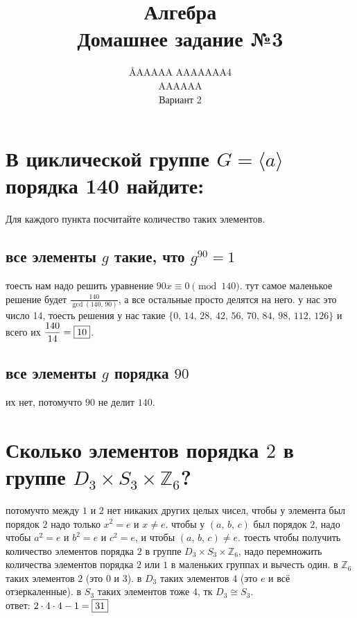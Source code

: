 \documentclass{article}
\title{Алгебра \\ Домашнее задание №3}
\author{\AA{AAAAA AAAAAAA}{4} \\ AAAAAA \\ Вариант 2}
\newcommand{\ds}{\displaystyle}
\newcommand{\Z}{\mathbb{Z}}
\renewcommand{\f}{\frac}
\begin{document}
  \maketitle

  \section{В циклической группе $G = \langle a \rangle$ порядка 140 найдите:}
  Для каждого пункта посчитайте количество таких элементов.
  \subsection{все элементы $g$ такие, что $g^{90} = 1$}
  тоесть нам надо решить уравнение $90x \equiv 0 \pmod{140}$.
  тут самое маленькое решение будет $\ds\f{140}{\gcd(140,\,90)}$,
  а все остальные просто делятся на него.
  у нас это число 14, тоесть решения у нас такие $\{0,\,14,\,28,\,42,\,56,\,70,\,84,\,98,\,112,\,126\}$
  и всего их $\ds \f{140}{14} = \fbox{10}$.
  \subsection{все элементы $g$ порядка $90$}
  их нет, потомучто $90$ не делит $140$.

  \section{Сколько элементов порядка $2$ в группе $D_3 \times S_3 \times \Z_6$?}
  потомучто между $1$ и $2$ нет никаких других целых чисел,
  чтобы у элемента был порядок $2$ надо только $x^2 = e$ и $x \neq e$.
  чтобы у $(a,\, b,\, c)$ был порядок $2$, надо чтобы $a^2 = e$ и $b^2 = e$ и $c^2 = e$, и чтобы $(a,\, b,\, c) \neq e$.
  тоесть чтобы получить количество элементов порядка $2$ в группе $D_3 \times S_3 \times \Z_6$,
  надо перемножить количества элементов порядка $2$ или $1$ в маленьких группах и вычесть один.
  в $\Z_6$ таких элементов $2$ (это $0$ и $3$).
  в $D_3$ таких элементов $4$ (это $e$ и всё отзеркаленные).
  в $S_3$ таких элементов тоже $4$, тк $D_3 \cong S_3$.
  \\ ответ: $2 \cdot 4 \cdot 4 - 1 = \fbox{31}$
\end{document}

